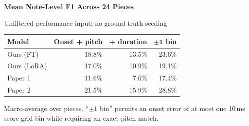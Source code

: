 \documentclass[border=14pt]{standalone}
\begin{document}
\begin{minipage}{12.2cm}
  \centering
  {\Large\bfseries Mean Note-Level F1 Across 24 Pieces\par}
  \vspace{3pt}
  {\small\color{muted}Unfiltered performance input; no ground-truth seeding\par}
  \vspace{10pt}

  \renewcommand{\arraystretch}{1.35}
  \setlength{\tabcolsep}{12pt}
  \begin{tabular}{>{\raggedright\arraybackslash}p{3.6cm} r r r}
    \arrayrulecolor{ruleblue}
    \toprule
    \rowcolor{headerblue}
    \textbf{Model} &
    \textbf{Onset + pitch} &
    \textbf{+ duration} &
    \textbf{$\boldsymbol{\pm 1}$ bin} \\
    \midrule
    Ours (FT)   & 18.8\% & 13.5\% & 23.6\% \\
    Ours (LoRA) & 17.0\% & 10.9\% & 19.1\% \\
    Paper 1     & 11.6\% &  7.6\% & 17.4\% \\
    Paper 2     & 21.5\% & 15.9\% & 28.8\% \\
    \bottomrule
  \end{tabular}

  \vspace{8pt}
  {\footnotesize\color{muted}
    Macro-average over pieces. ``$\pm 1$ bin'' permits an onset error of at most
    one 10\,ms score-grid bin while requiring an exact pitch match.\par}
\end{minipage}
\end{document}
